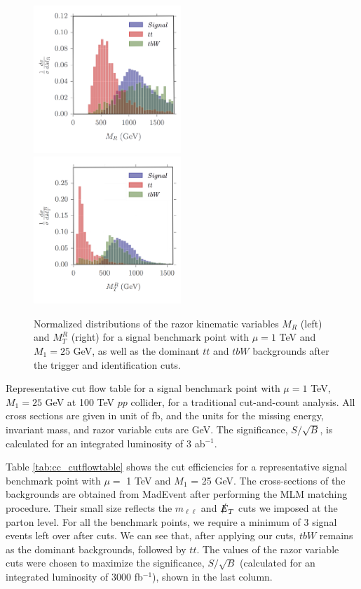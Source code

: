 \documentclass[a4paper,11pt]{article}
\begin{document}
\begin{figure}[h]
\centering
\includegraphics[trim = {0.3cm 0.6cm 0.1cm 0}, clip, width=0.496\textwidth]{images/mR_copy.png}
\includegraphics[trim = {0.3cm 0.6cm 0.1cm 0}, clip, width=0.496\textwidth]{images/mTR_copy.png}
\caption{Normalized distributions of the razor kinematic variables $M_R$
  (left) and $M_T^R$ (right) for  a signal benchmark point with $\mu=1$ TeV and $M_1=25$ GeV,
  as well as the dominant $tt$ and $tbW$ backgrounds
  after the trigger and identification cuts.}
\label{fig:razor_histos}
\end{figure}

\begin{table}[h]
  \centering
  
  \caption{Representative cut flow table for a signal benchmark point with $\mu=1$ TeV,
    $M_1 = 25$ GeV at 100  TeV $pp$ collider, for a traditional cut-and-count analysis. All cross sections
    are given in unit of fb, and the units for the missing energy, invariant
    mass, and razor variable cuts are GeV. The significance, $S/\sqrt{B}$, is
    calculated for an integrated luminosity of 3 ab$^{-1}$.  }
\label{tab:cc_cutflowtable}
\end{table}

Table \ref{tab:cc_cutflowtable} shows the cut efficiencies for a representative
signal benchmark point with $\mu =$ 1 TeV and $M_1$ = 25 GeV.   The
cross-sections of the backgrounds are obtained from MadEvent after performing the MLM matching procedure. Their small size reflects
the $m_{\ell\ell}$ and $\slashed{E}_T$ cuts we imposed at the parton level. For all
the benchmark points, we require a minimum of 3 signal events left over after
cuts. We can see that, after applying our cuts, $tbW$ remains as the
dominant backgrounds, followed by $tt$.   The values of the razor variable cuts were chosen to
maximize the significance, $S/\sqrt{B}$ (calculated for an integrated luminosity
of 3000 fb$^{-1}$), shown in the last column.  
\end{document}
